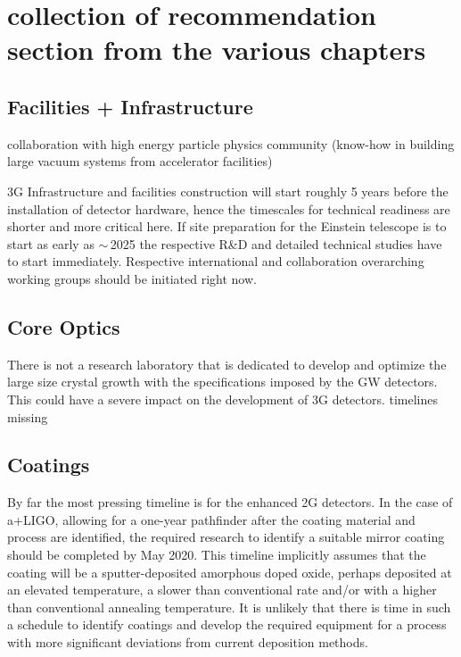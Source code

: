 
\newpage
\section{collection of recommendation section from the various chapters}
\subsection{Facilities + Infrastructure}
collaboration with high energy particle physics community (know-how in building large vacuum
systems from accelerator facilities)

3G Infrastructure and facilities construction will start roughly 5 years before the installation of detector hardware, hence the timescales for technical readiness are shorter and more critical here.
If site preparation for the Einstein telescope is to start as early as $\sim$\,2025 the respective R\&D and detailed technical studies have to start immediately. Respective international and collaboration overarching working groups should be initiated right now.

\subsection{Core Optics}
There is not a research laboratory that is dedicated to develop and optimize the large size crystal growth with the specifications imposed by the GW detectors. This could have a severe impact on the development of 3G detectors.
timelines missing
\subsection{Coatings}
By far the most pressing timeline is for the enhanced 2G detectors. In the case of a+LIGO, allowing for a one-year pathfinder after the coating material and process are identified, the required research to identify a suitable mirror coating should be completed by May 2020. This timeline implicitly assumes that the coating will be a sputter-deposited amorphous doped oxide, perhaps deposited at an elevated temperature, a slower than conventional rate and/or with a higher than conventional annealing temperature. It is unlikely that there is time in such a schedule to identify coatings and develop the required equipment for a process with more significant deviations from current deposition methods.

